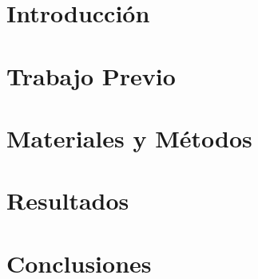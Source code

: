 \documentclass{beamer}
\title{\tituloTesis}
\author{Damián Eliel Aleman}
\begin{document}
\beamertemplatenavigationsymbolsempty



\frame{\titlepage}

\section{Introducción}


\section{Trabajo Previo}



\section{Materiales y Métodos}


\section{Resultados}


\section{Conclusiones}

\end{document}
